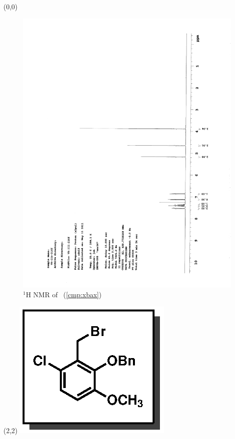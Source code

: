\begin{textblock}{20}(0,0)
\begin{figure}[htb]
\caption{$^1$H NMR of \CMPxbax\ (\ref{cmp:xbax})}
\includegraphics[scale=0.75, trim = 0mm 0mm 0mm 5mm,
clip]{chp_singlecarbon/images/nmr/xbaxH}
\vspace{-100pt}
\end{figure}
\end{textblock}
\begin{textblock}{1}(2,2)
\includegraphics[scale=0.8, angle=90]{chp_singlecarbon/images/xbax}
\end{textblock}
